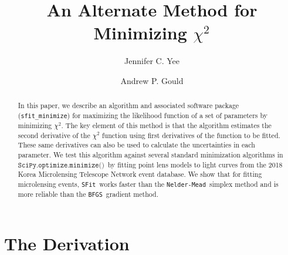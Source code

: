 \documentclass[preprint]{aastex631}
\newcommand{\minimize}{$\texttt{SciPy.optimize.minimize()}$}
\newcommand{\neldarmead}{\texttt{Nelder-Mead}}
\newcommand{\bfgs}{\texttt{BFGS}}
\newcommand{\sfit}{\texttt{SFit}}
\begin{document}
\title{An Alternate Method for Minimizing $\chi^2$}

\author{Jennifer C. Yee}
\author{Andrew P. Gould}

\begin{abstract}
In this paper, we describe an algorithm and associated software package (\texttt{sfit\_minimize}) for maximizing the likelihood function of a set of parameters by minimizing $\chi^2$. The key element of this method is that the algorithm estimates the second derivative of the $\chi^2$ function using first derivatives of the function to be fitted. These same derivatives can also be used to calculate the uncertainties in each parameter. We test this algorithm against several standard minimization algorithms in \minimize\, by fitting point lens models to light curves from the 2018 Korea Microlensing Telescope Network event database. We show that for fitting microlensing events, \sfit\, works faster than the \neldarmead\, simplex method and is more reliable than the \bfgs\, gradient method.
\end{abstract}

\section{The Derivation}
\end{document}
